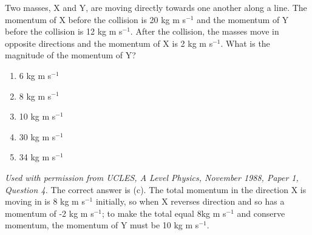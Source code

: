 

\begin{problem}
{Two masses, X and Y, are moving directly towards one another along a line. The momentum of X before the collision is 20 kg m s$^{-1}$ and the momentum of Y before the collision is 12 kg m s$^{-1}$. After the collision, the masses move in opposite directions and the momentum of X is 2 kg m s$^{-1}$. What is the magnitude of the momentum of Y?
\begin{enumerate}
	\item 6 kg m s$^{-1}$
	\item 8 kg m s$^{-1}$
	\item 10 kg m s$^{-1}$ \answer
	\item 30 kg m s$^{-1}$
	\item 34 kg m s$^{-1}$
\end{enumerate}
}
{\textit{Used with permission from UCLES, A Level Physics, November 1988, Paper 1, Question 4.}}
{The correct answer is (c). The total momentum in the direction X is moving in is 8 kg m s$^{-1}$ initially, so when X reverses direction and so has a momentum of -2 kg m s$^{-1}$; to make the total equal 8kg m s$^{-1}$ and conserve momentum, the momentum of Y must be 10 kg m s$^{-1}$.}
\end{problem}
